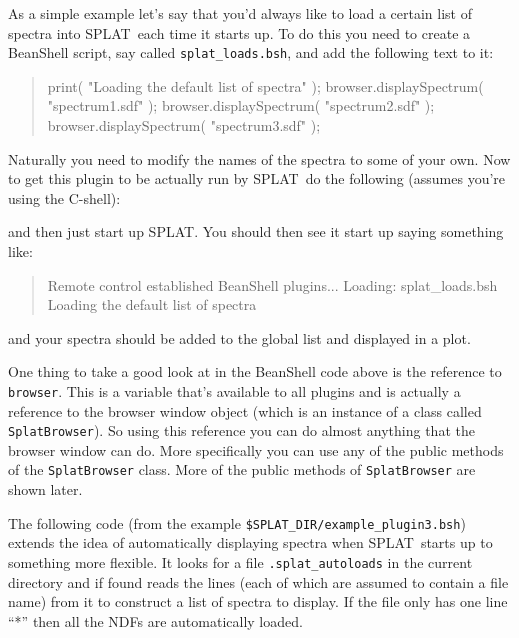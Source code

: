 \documentclass[twoside,11pt,nolof]{starlink}
\providecommand{\SPLAT}{\textsf{SPLAT}}
\providecommand{\hitext}[1]{\texttt{#1}}
\begin{document}
As a simple example let's say that you'd always like to load a certain
list of spectra into \SPLAT\ each time it starts up. To do this you
need to create a BeanShell script, say called
\hitext{splat\_loads.bsh}, and add the following text to it:
\begin{quote}
\begin{terminalv}
print( "Loading the default list of spectra" );
browser.displaySpectrum( "spectrum1.sdf" );
browser.displaySpectrum( "spectrum2.sdf" );
browser.displaySpectrum( "spectrum3.sdf" );
\end{terminalv}
\end{quote}
Naturally you need to modify the names of the spectra to some of your
own. Now to get this plugin to be actually run by \SPLAT\ do the
following (assumes you're using the C-shell):
\begin{quote}
\begin{terminalv}
\end{terminalv}
\end{quote}
and then just start up \SPLAT. You should then see it start up saying
something like:
\begin{quote}
\begin{terminalv}
Remote control established
BeanShell plugins...
Loading: splat_loads.bsh
Loading the default list of spectra
\end{terminalv}
\end{quote}
and your spectra should be added to the global list and displayed in a
plot.

One thing to take a good look at in the BeanShell code above is the
reference to \hitext{browser}. This is a variable that's available to
all plugins and is actually a reference to the browser window object
(which is an instance of a class called \hitext{SplatBrowser}). So
using this reference you can do almost anything that the browser
window can do. More specifically you can use any of the public methods
of the \hitext{SplatBrowser} class. More of the public methods of
\hitext{SplatBrowser} are shown later.

The following code (from the example
\hitext{\$SPLAT\_DIR/example\_plugin3.bsh}) extends the idea of
automatically displaying spectra when \SPLAT\ starts up to something
more flexible. It looks for a file \hitext{.splat\_autoloads} in the
current directory and if found reads the lines (each of which are
assumed to contain a file name) from it to construct a list of spectra
to display. If the file only has one line ``*'' then all the NDFs are
automatically loaded.
\end{document}

